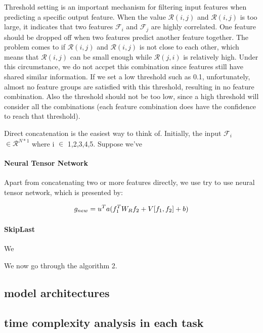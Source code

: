 \documentclass[sigconf]{acmart}
\begin{document}
  Threshold setting is an important mechanism for filtering input features when predicting a specific output feature.
  When the value $\mathcal R(i,j)$ and $\mathcal R(i,j)$ is too large, it indicates that two features $\mathcal F_{i}$ and $\mathcal F_{j}$ are
  highly correlated. One feature should be dropped off when two features predict another feature together. The problem comes to 
  if $\mathcal R(i,j)$ and $\mathcal R(i,j)$ is not close to each other, which means that $\mathcal R(i,j)$ can be small enough while 
  $\mathcal R(j,i)$ is relatively high. Under this circumstance, we do not accpet this combination since features still have shared 
  similar information. If we set a low threshold such as 0.1, unfortunately, almost no feature groups are satisfied with this 
  threshold, resulting in no feature combination.  Also the threshold should not be too low, since 
  a high threshold will consider all the combinations (each feature combination does have the confidence to reach that 
  threshold). 




  Direct concatenation is the easiest way to think of. Initially, the input $\mathcal F_{i}$ $\in \mathcal R^{N * 1}$
where i $\in$ 1,2,3,4,5. Suppose we've 



\paragraph{Neural Tensor Network}
Apart from concatenating two or more features directly, we use try to use neural tensor network,
which is presented by:

\begin{equation}
  g_{new} = u^{T} a(f_{1}^{T} W_{R} f_{2} + V [ f_{1}, f_{2} ] + b) \\ 
\end{equation}




\paragraph{SkipLast}We

We now go through the algorithm 2.




\subsection{model architectures}


\subsection{time complexity analysis in each task}
\end{document}
